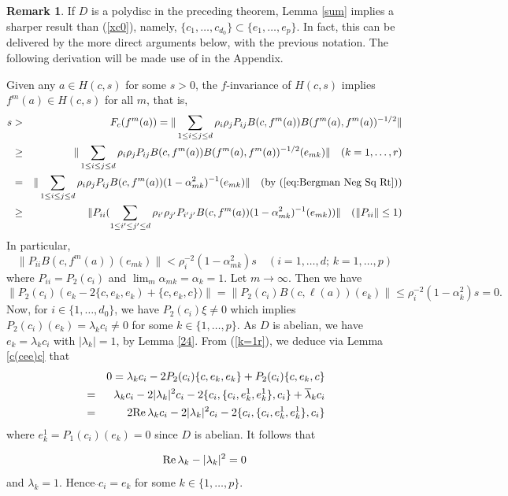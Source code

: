 \documentclass[12pt, twoside]{article}
\theoremstyle{definition}
\newtheorem{remark}[theorem]{Remark}
\numberwithin{equation}{section}
\begin{document}
\begin{remark}\label{dw1} If $D$ is a polydisc in the preceding theorem,
Lemma \ref{sum} implies a sharper result than (\ref{xc0}), namely, $\{c_1, \ldots, c_{d_0}\} \subset \{e_1, \ldots, e_p\}$.
In fact, this can be delivered by the  more direct arguments below, with the previous notation. The following derivation will be
made use of in the Appendix.

Given any $a \in H(c,s)$ for some $s>0$, the $f$-invariance of $H(c,s)$ implies $f^m(a) \in H(c,s)$ for all $m$, that is,
\begin{eqnarray*}
s &>&F_c(f^m(a)) = \|\sum_{1\leq i\leq j\leq d}\rho_i\rho_jP_{ij}B(c,f^m(a))B(f^m(a),f^m(a))^{-1/2}\|\\
&\geq & \|\sum_{1\leq i\leq j\leq d}\rho_i\rho_jP_{ij}B(c,f^m(a))B(f^m(a),f^m(a))^{-1/2}(e_{mk})\|
\quad (k =1, \ldots, r)\\
&=& \|\sum_{1\leq i\leq j\leq d}\rho_i\rho_jP_{ij}B(c,f^m(a))(1-\alpha_{mk}^2)^{-1}(e_{mk})\|
\quad \mbox{(by (\ref{eq:Bergman Neg Sq Rt}))}\\
&\geq &
 \|P_{ii}(\sum_{1\leq i'\leq j'\leq d}\rho_{i'}\rho_{j'}P_{i'j'}B(c,f^m(a))(1-\alpha_{mk}^2)^{-1}(e_{mk}))\|
 \quad  (\|P_{ii}\|\leq 1)
\end{eqnarray*}
In particular,
\begin{equation}\label{ki'}
\|P_{ii}B(c,f^m(a))(e_{mk})\| < \rho_i ^{-2} (1-\alpha_{mk}^2) s \quad (i = 1, \ldots, d;\,k =1, \ldots, p)
\end{equation}
where $P_{ii}= P_2(c_i)$ and $\lim_m \alpha_{mk} =\alpha_k =1$. Let $m\rightarrow \infty$. Then we have
\begin{equation}\label{k=1r}
\|P_2(c_i)(e_k - 2\{c,  e_k, e_k) +\{c,  e_k, c\})\|=\|P_2(c_i)B(c, \ell (a))(e_k) \|
\leq \rho_i^{-2} (1-\alpha_k^2) s =0.
\end{equation}
 Now, for $i \in \{1, \ldots, d_0\}$, we have $P_2(c_i)\xi \neq 0$ which implies $P_2(c_i)(e_k)
=\lambda_k c_i \neq 0$ for some $k\in \{1, \ldots, p\}$. As $D$ is abelian, we have $e_k= \lambda_kc_i $ with  $|\lambda_k|=1$,
by Lemma \ref{24}.
 From (\ref{k=1r}), we deduce via Lemma \ref {c(cee)c} that
\begin{eqnarray*}
&&0 = \lambda_k c_i - 2 P_2(c_i)\{c, e_k,e_k\} + P_2(c_i)\{c, e_k,c\}\\
&=& \lambda_k c_i -2|\lambda_k|^2 c_i -2\{c_i, \{c_i, e_k^1, e_k^1\}, c_i\} +\overline\lambda_k c_i\\
&=& 2{\rm Re}\,\lambda_k c_i -2|\lambda_k|^2 c_i -2\{c_i, \{c_i, e_k^1, e_k^1\}, c_i\}
\end{eqnarray*}
where $e_k^1 = P_1(c_i)(e_k)=0$ since $D$ is abelian. It follows that

\begin{equation}\label{c_i}{\rm Re}\,\lambda_k  -|\lambda_k|^2=0
\end{equation}
and $\lambda_k =1$.  Hence $\ddot{}c_i =e_k$ for some $k\in \{1, \ldots, p\}$.
\end{remark}
\end{document}
